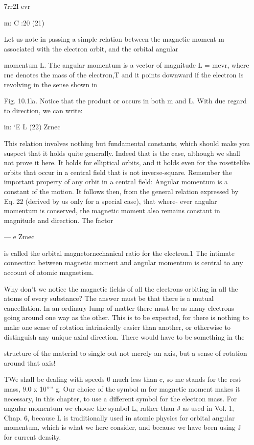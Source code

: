7rr2I evr

m: C :20 (21)

Let us note in passing a simple relation between the magnetic
moment m associated with the electron orbit, and the orbital angular

momentum L. The angular momentum is a vector of magnitude
L = mevr, where rne denotes the mass of the electron,T and it points
downward if the electron is revolving in the sense shown in

Fig. 10.1la. Notice that the product or occurs in both m and L.
With due regard to direction, we can write:
\begin{equation}
\end{equation}

in: ‘E L (22)
Zrnec

This relation involves nothing but fundamental constants, which
should make you suspect that it holds quite generally. Indeed that
is the case, although we shall not prove it here. It holds for elliptical
orbits, and it holds even for the rosettelike orbits that occur in a
central field that is not inverse-square. Remember the important
property of any orbit in a central field: Angular momentum is a constant
of the motion. It follows then, from the general relation expressed
by Eq. 22 (derived by us only for a special case), that where-
ever angular momentum is conserved, the magnetic moment also
remains constant in magnitude and direction. The factor
\begin{equation}
\end{equation}

 ---  e
Zmec

is called the orbital magnetornechanical ratio for the electron.1 The
intimate connection between magnetic moment and angular momentum
is central to any account of atomic magnetism.

Why don't we notice the magnetic fields of all the electrons orbiting
in all the atoms of every substance? The answer must be that
there is a mutual cancellation. In an ordinary lump of matter there
must be as many electrons going around one way as the other. This
is to be expected, for there is nothing to make one sense of rotation
intrinsically easier than another, or otherwise to distinguish any
unique axial direction. There would have to be something in the

structure of the material to single out not merely an axis, but a sense
of rotation around that axis!

TWe shall be dealing with speeds 0 much less than c, so me stands for the rest mass,
9.0 x 10'''' g. Our choice of the symbol m for magnetic moment makes it 
necessary, in this chapter, to use a different symbol for the electron mass. For angular
momentum we choose the symbol L, rather than J as used in Vol. 1, Chap. 6, because
L is traditionally used in atomic physics for orbital angular momentum, which is what
we here consider, and because we have been using J for current density.

